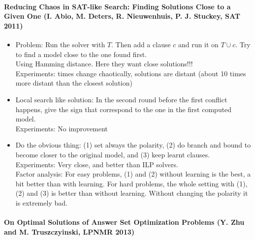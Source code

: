
\newpage
\paragraph{Reducing Chaos in SAT-like Search: Finding Solutions Close to a Given One (I. Abio, M. Deters, R. Nieuwenhuis, P. J. Stuckey, SAT 2011)}

\begin{itemize}
\item
    Problem: Run the solver with $T$. 
    Then add a clause $c$ and run it on $T \cup c$. 
    Try to find a model close to the one found first.
    \\
    Using Hamming distance. Here they want close solutions!!!
    \\
    Experiments: times change chaotically, solutions are distant 
    (about 10 times more distant than the closest solution)
\item
    Local search like solution:
    In the second round before the first conflict happens, 
    give the sign that correspond to the one in the first computed model.
    \\
    Experiments: No improvement
\item
    Do the obvious thing: (1) set always the polarity, 
    (2) do branch and bound to become closer to the original model, 
    and (3) keep learnt clauses.
    \\
    Experiments: Very close, and better than ILP solvers.
    \\
    Factor analysis: For easy problems, (1) and (2) without learning is the best, a bit better than with learning.
    For hard problems, the whole setting with (1), (2) and (3) is better than without learning.
    Without changing the polarity it is extremely bad.
\end{itemize}


\newpage
\paragraph{On Optimal Solutions of Answer Set Optimization Problems (Y. Zhu and M. Truszczyinski, LPNMR 2013)}

